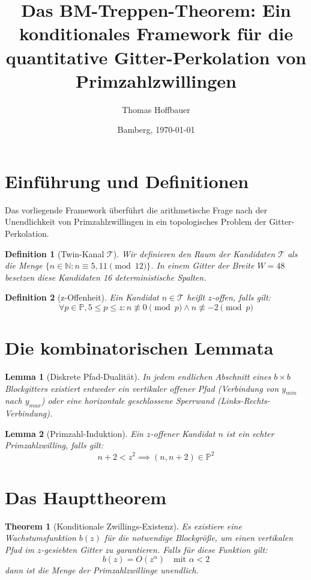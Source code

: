 \documentclass[12pt]{article}
\title{Das BM-Treppen-Theorem: Ein konditionales Framework für die quantitative Gitter-Perkolation von Primzahlzwillingen}
\author{Thomas Hoffbauer}
\date{Bamberg, \today}
\newtheorem{theorem}{Theorem}
\newtheorem{lemma}{Lemma}
\newtheorem{definition}{Definition}
\begin{document}
	
	\maketitle
	
	\section{Einführung und Definitionen}
	
	Das vorliegende Framework überführt die arithmetische Frage nach der Unendlichkeit von Primzahlzwillingen in ein topologisches Problem der Gitter-Perkolation.
	
	\begin{definition}[Twin-Kanal $\mathcal{T}$]
		Wir definieren den Raum der Kandidaten $\mathcal{T}$ als die Menge $\{n \in \mathbb{N} : n \equiv 5, 11 \pmod{12}\}$. In einem Gitter der Breite $W=48$ besetzen diese Kandidaten 16 deterministische Spalten.
	\end{definition}
	
	\begin{definition}[z-Offenheit]
		Ein Kandidat $n \in \mathcal{T}$ heißt $z$-offen, falls gilt:
		\[ \forall p \in \mathbb{P}, 5 \le p \le z: n \not\equiv 0 \pmod p \land n \not\equiv -2 \pmod p \]
	\end{definition}
	
	\section{Die kombinatorischen Lemmata}
	
	\begin{lemma}[Diskrete Pfad-Dualität]
		In jedem endlichen Abschnitt eines $b \times b$ Blockgitters existiert entweder ein vertikaler offener Pfad (Verbindung von $y_{min}$ nach $y_{max}$) oder eine horizontale geschlossene Sperrwand (Links-Rechts-Verbindung).
	\end{lemma}
	
	\begin{lemma}[Primzahl-Induktion]
		Ein $z$-offener Kandidat $n$ ist ein echter Primzahlzwilling, falls gilt:
		\[ n + 2 < z^2 \implies (n, n+2) \in \mathbb{P}^2 \]
	\end{lemma}
	
	\section{Das Haupttheorem}
	
	\begin{theorem}[Konditionale Zwillings-Existenz]
		Es existiere eine Wachstumsfunktion $b(z)$ für die notwendige Blockgröße, um einen vertikalen Pfad im $z$-gesiebten Gitter zu garantieren. Falls für diese Funktion gilt:
		\[ b(z) = O(z^\alpha) \quad \text{mit } \alpha < 2 \]
		dann ist die Menge der Primzahlzwillinge unendlich.
	\end{theorem}
	
\end{document}
